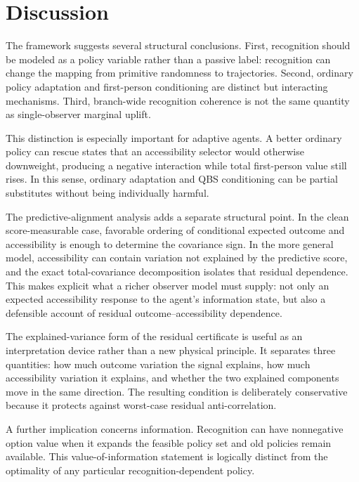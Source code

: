 \section{Discussion}

The framework suggests several structural conclusions. First, recognition should be modeled as a policy variable rather than a passive label: recognition can change the mapping from primitive randomness to trajectories. Second, ordinary policy adaptation and first-person conditioning are distinct but interacting mechanisms. Third, branch-wide recognition coherence is not the same quantity as single-observer marginal uplift.

This distinction is especially important for adaptive agents. A better ordinary policy can rescue states that an accessibility selector would otherwise downweight, producing a negative interaction while total first-person value still rises. In this sense, ordinary adaptation and QBS conditioning can be partial substitutes without being individually harmful.

The predictive-alignment analysis adds a separate structural point. In the clean score-measurable case, favorable ordering of conditional expected outcome and accessibility is enough to determine the covariance sign. In the more general model, accessibility can contain variation not explained by the predictive score, and the exact total-covariance decomposition isolates that residual dependence. This makes explicit what a richer observer model must supply: not only an expected accessibility response to the agent's information state, but also a defensible account of residual outcome--accessibility dependence.

The explained-variance form of the residual certificate is useful as an interpretation device rather than a new physical principle. It separates three quantities: how much outcome variation the signal explains, how much accessibility variation it explains, and whether the two explained components move in the same direction. The resulting condition is deliberately conservative because it protects against worst-case residual anti-correlation.

A further implication concerns information. Recognition can have nonnegative option value when it expands the feasible policy set and old policies remain available. This value-of-information statement is logically distinct from the optimality of any particular recognition-dependent policy.

